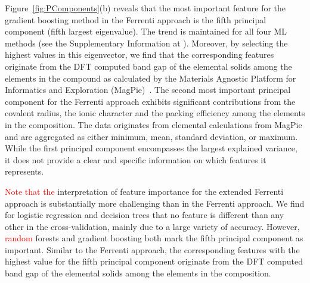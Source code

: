 \documentclass[superscriptaddress,unsortedaddress,
 amsmath,amssymb,
 aps,
]{revtex4-2}
\newcommand{\mrk}[1]{\textcolor{red}{#1}}
\begin{document}
Figure~\ref{fig:PComponents}(b) reveals that the most important feature for the gradient boosting method in the Ferrenti approach is the fifth principal component (fifth largest eigenvalue). The trend is maintained for all four ML methods (see the Supplementary Information at \cite{supplementary}). Moreover, by selecting the highest values in this eigenvector, we find that the corresponding features originate from the DFT computed band gap of the elemental solids among the elements in the compound as calculated by the Materials Agnostic Platform for Informatics and Exploration (MagPie)~\cite{magpie}. 
The second most important principal component for the Ferrenti approach exhibits significant contributions from the covalent radius, the ionic character and the packing efficiency among the elements in the composition. 
The data originates from elemental calculations from MagPie and are aggregated as either minimum, mean, standard deviation, or maximum. 
While the first principal component encompasses the largest explained variance, it does not provide a clear and specific information on which features it represents. 

\mrk{Note that the} interpretation of feature importance for the extended Ferrenti approach is substantially more challenging than in the Ferrenti approach. We find for logistic regression and decision trees that no feature is different than any other in the cross-validation, mainly due to a large variety of accuracy. However, \mrk{random} forests and gradient boosting both mark the fifth principal component as important. Similar to the Ferrenti approach, the corresponding features with the highest value for the fifth principal component originate from the DFT computed band gap of the elemental solids among the elements in the composition. 
\end{document}
